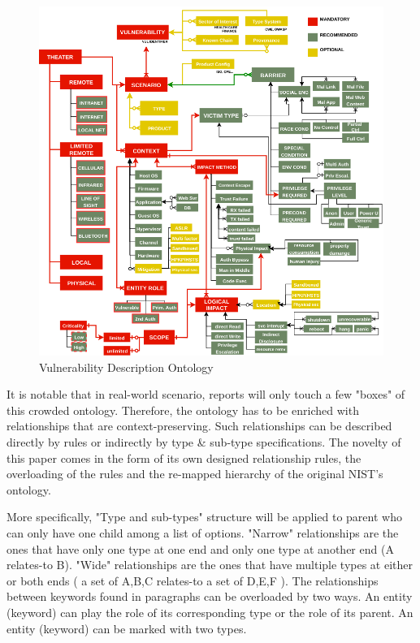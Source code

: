 \documentclass[conference]{IEEEtran}
\begin{document}
\begin{figure}[ht]
  \centering
  \includegraphics[width=16cm]{./images/NISTIR8138}
  \caption{Vulnerability Description Ontology}
  \label{Figure:VulOntology}
\end{figure}

It is notable that in real-world scenario, reports will only touch a few "boxes" of this crowded ontology. Therefore, the ontology has to be enriched with relationships that are context-preserving. Such relationships can be described directly by rules or indirectly by type \& sub-type specifications. The novelty of this paper comes in the form of its own designed relationship rules, the overloading of the rules and the re-mapped hierarchy of the original NIST's ontology.

More specifically, "Type and sub-types" structure will be applied to parent who can only have one child among a list of options. "Narrow" relationships are the ones that have only one type at one end and only one type at another end (A relates-to B). "Wide" relationships are the ones that have multiple types at either or both ends ( a set of {A,B,C} relates-to a set of {D,E,F} ). The relationships between keywords found in paragraphs can be overloaded by two ways. An entity (keyword) can play the role of its corresponding type or the role of its parent. An entity (keyword) can be marked with two types.
\end{document}
